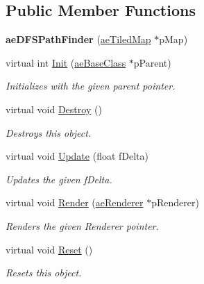 \subsection*{Public Member Functions}
\begin{DoxyCompactItemize}
\item 
{\bfseries ae\+D\+F\+S\+Path\+Finder} (\hyperlink{classae_tiled_map}{ae\+Tiled\+Map} $\ast$p\+Map)\hypertarget{classae_d_f_s_path_finder_a34e76a7ed15b44cbd938888c2c80efb0}{}\label{classae_d_f_s_path_finder_a34e76a7ed15b44cbd938888c2c80efb0}

\item 
virtual int \hyperlink{classae_d_f_s_path_finder_a520c7725e3322b43fd7320da622c1b75}{Init} (\hyperlink{classae_base_class}{ae\+Base\+Class} $\ast$p\+Parent)
\begin{DoxyCompactList}\small\item\em Initializes with the given parent pointer. \end{DoxyCompactList}\item 
virtual void \hyperlink{classae_d_f_s_path_finder_a18f1efb48ab57e5e9eb94b29b8459430}{Destroy} ()\hypertarget{classae_d_f_s_path_finder_a18f1efb48ab57e5e9eb94b29b8459430}{}\label{classae_d_f_s_path_finder_a18f1efb48ab57e5e9eb94b29b8459430}

\begin{DoxyCompactList}\small\item\em Destroys this object. \end{DoxyCompactList}\item 
virtual void \hyperlink{classae_d_f_s_path_finder_a7751f27e031719afee45bfd29731b969}{Update} (float f\+Delta)
\begin{DoxyCompactList}\small\item\em Updates the given f\+Delta. \end{DoxyCompactList}\item 
virtual void \hyperlink{classae_d_f_s_path_finder_a2dc1c27f419be5b7a3e94c8be93aede6}{Render} (\hyperlink{classae_core_1_1ae_renderer}{ae\+Renderer} $\ast$p\+Renderer)
\begin{DoxyCompactList}\small\item\em Renders the given Renderer pointer. \end{DoxyCompactList}\item 
virtual void \hyperlink{classae_d_f_s_path_finder_a751a469a5e0177cf419a60563749bd6a}{Reset} ()\hypertarget{classae_d_f_s_path_finder_a751a469a5e0177cf419a60563749bd6a}{}\label{classae_d_f_s_path_finder_a751a469a5e0177cf419a60563749bd6a}

\begin{DoxyCompactList}\small\item\em Resets this object. \end{DoxyCompactList}\end{DoxyCompactItemize}
